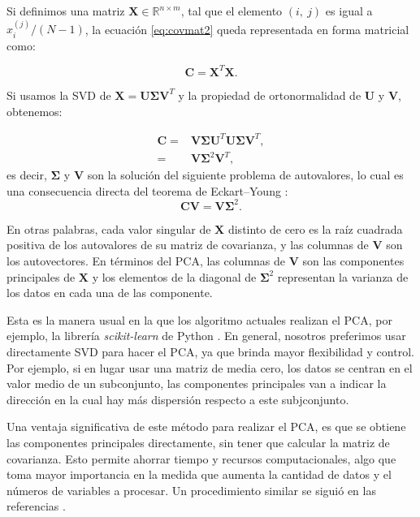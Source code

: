 Si definimos una matriz $\mathbf{X} \in \mathbb{R}^{n \times m}$, tal que el elemento $(i,\ j)$ es igual a $x_i^{(j)}/(N-1)$, la ecuación \eqref{eq:covmat2} queda representada en forma matricial como:

\begin{equation}
	\mathbf{C} = \mathbf{X}^T  \mathbf{X}.
\end{equation}

Si usamos la SVD de $\mathbf{X} = \mathbf{U} \mathbf{\Sigma} \mathbf{V}^T$ y la propiedad de ortonormalidad de $\mathbf{U}$ y $\mathbf{V}$, obtenemos:

\begin{eqnarray}
	\mathbf{C} =& \mathbf{V} \mathbf{\Sigma} \mathbf{U}^T \mathbf{U} \mathbf{\Sigma} \mathbf{V}^T, \\
	=& \mathbf{V} \mathbf{\Sigma}^2 \mathbf{V}^T,
\end{eqnarray}
es decir, $\mathbf{\Sigma}$ y $\mathbf{V}$ son la solución del siguiente problema de autovalores, lo cual es una consecuencia directa del teorema de Eckart–Young \cite{EckartYoung1936}:
\begin{equation}
	\mathbf{C} \mathbf{V} = \mathbf{V} \mathbf{\Sigma}^2.
\end{equation}

En otras palabras, cada valor singular de $\mathbf{X}$ distinto de cero es la raíz cuadrada positiva de los autovalores de su matriz de covarianza, y las columnas de $\mathbf{V}$ son los autovectores. En términos del PCA, las columnas de $\mathbf{V}$ son las componentes principales de $\mathbf{X}$ y los elementos de la diagonal de $\mathbf{\Sigma}^2$ representan la varianza de los datos en cada una de las componente.

Esta es la manera usual en la que los algoritmo actuales realizan el PCA, por ejemplo, la librería \emph{scikit-learn} de Python \cite{scikit-learn}. En general, nosotros preferimos usar directamente SVD para hacer el PCA, ya que brinda mayor flexibilidad y control. Por ejemplo, si en lugar usar una matriz de media cero, los datos se centran en el valor medio de un subconjunto, las componentes principales van a indicar la dirección en la cual hay más dispersión respecto a este subjconjunto.

Una ventaja significativa de este método para realizar el PCA, es que se obtiene las componentes principales directamente, sin tener que calcular la matriz de covarianza. Esto permite ahorrar tiempo y recursos computacionales, algo que toma mayor importancia en la medida que aumenta la cantidad de datos y el números de variables a procesar. Un procedimiento similar se siguió en las referencias \cite{Gonzalez_2023, Gonzalez_2021}.


